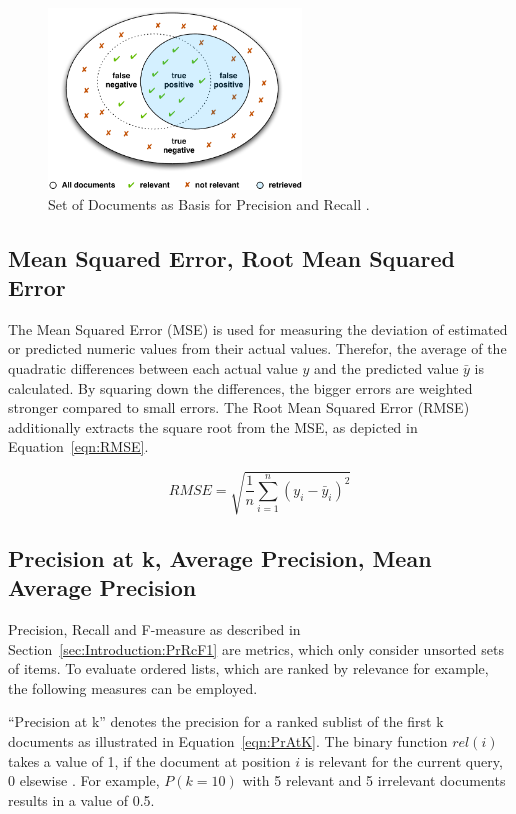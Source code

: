 \begin{figure}[t!]
\centering
\includegraphics[width=0.6\textwidth]{img/PrecisionRecallSets.pdf}
\caption{Set of Documents as Basis for Precision and Recall \cite{katz2010diploma}.}
\label{fig:PrecisionRecall}
\end{figure}

\subsection{Mean Squared Error, Root Mean Squared Error}

The Mean Squared Error (MSE) is used for measuring the deviation of estimated or predicted numeric values from their actual values. Therefor, the average of the quadratic differences between each actual value $y$ and the predicted value $\bar y$ is calculated. By squaring down the differences, the bigger errors are weighted stronger compared to small errors. The Root Mean Squared Error (RMSE) additionally extracts the square root from the MSE, as depicted in Equation~\ref{eqn:RMSE}.

\begin{equation}
	\mathit{RMSE} = \sqrt{\frac{1}{n} \sum\limits_{i=1}^{n}(y_i - \bar y_i)^2}
	\label{eqn:RMSE}
\end{equation}

\subsection{Precision at k, Average Precision, Mean Average Precision}

Precision, Recall and F-measure as described in Section~\ref{sec:Introduction:PrRcF1} are metrics, which only consider unsorted sets of items. To evaluate ordered lists, which are ranked by relevance for example, the following measures can be employed.

``Precision at k'' denotes the precision for a ranked sublist of the first k documents as illustrated in Equation~\ref{eqn:PrAtK}. The binary function $rel(i)$ takes a value of 1, if the document at position $i$ is relevant for the current query, 0 elsewise \cite{Mahesh:1999}. For example, $P(k = 10)$ with 5 relevant and 5 irrelevant documents results in a value of 0.5.

